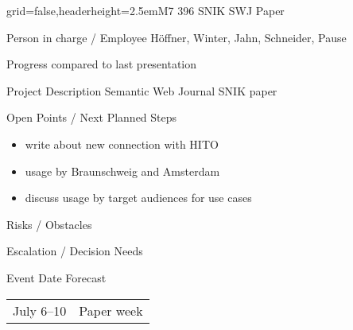 \documentclass[english]{kiesgrube}
\begin{document}
\begin{poster}{grid=false,headerheight=2.5em}{}{M7 396 SNIK SWJ Paper}{}{}
\begin{posterbox}[name=person,column=0,row=0]{Person in charge / Employee}
Höffner, Winter, Jahn, Schneider, Pause
\end{posterbox}
\begin{posterbox}[name=progress,below=person]{Progress compared to last presentation}
\end{posterbox}
\begin{posterbox}[name=description,column=1,row=0]{Project Description}
Semantic Web Journal SNIK paper
\end{posterbox}
\begin{posterbox}[name=open,column=1,below=description]{Open Points / Next Planned Steps}
\begin{itemize}
\item write about new connection with HITO
\item usage by Braunschweig and Amsterdam
\item discuss usage by target audiences for use cases
\end{itemize}
\end{posterbox}
\begin{posterbox}[name=risks,column=1,below=open]{Risks / Obstacles}
\end{posterbox}
\begin{posterbox}[name=escalation,column=1,below=risks]{Escalation / Decision Needs}
\end{posterbox}
\begin{posterbox}[name=event,column=0,below=progress]{Event Date Forecast}
\begin{tabulary}{\textwidth}{lL}
July 6--10	&Paper week\\
\end{tabulary}
\end{posterbox}
\footer
\end{poster}
\end{document}
